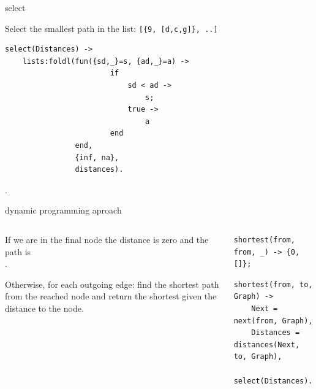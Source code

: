 \begin{frame}[fragile]{select}

Select the smallest path in the list: \texttt{[\{9, [d,c,g]\}, ..]}

\vspace{10pt}\pause

\begin{verbatim}
select(Distances) ->
    lists:foldl(fun({sd,_}=s, {ad,_}=a) ->
                        if 
                            sd < ad ->
                                s;
                            true ->
                                a
                        end
                end,
                {inf, na},
                distances).
\end{verbatim}

\pause{}.
\end{frame}

\begin{frame}[fragile]{dynamic programming aproach}

\begin{columns}
 \begin{column}{0.4\linewidth}
  If we are in the final node the distance is zero and the path is \[\].

  \vspace{10pt}
  Otherwise, for each outgoing edge: find the shortest path from the
  reached node and return the shortest given the distance to the node.

 \end{column}
 \begin{column}{0.6\linewidth}
   \begin{verbatim}
shortest(from, from, _) -> {0, []};
  \end{verbatim}
  \pause
  \begin{verbatim}
shortest(from, to, Graph) ->
    Next = next(from, Graph),
    Distances = distances(Next, to, Graph),
    select(Distances).
  \end{verbatim}
 \end{column}
\end{columns}

\pause\vspace{20pt}{\em What is the complexity?}

\end{frame}



